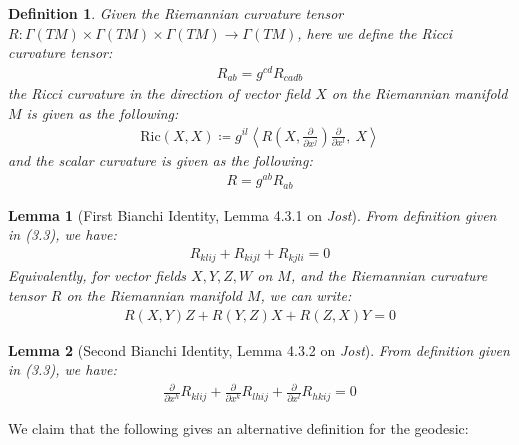 \documentclass[11pt]{book}
\theoremstyle{break}
\theoremstyle{break}
\newtheorem{lem}{Lemma}[thm]
\newtheorem{defn}{Definition}[corL]
\newcommand{\pd}{\partial}
\begin{document}
\begin{defn}
Given the Riemannian curvature tensor $R:\Gamma(TM) \times \Gamma(TM) \times \Gamma(TM) \to \Gamma(TM)$, here we define the Ricci curvature tensor:
\begin{align*}
R_{ab} = g^{cd}R_{cadb}
\end{align*}
the Ricci curvature in the direction of vector field $X$ on the Riemannian manifold $M$ is given as the following:
\begin{align*}
\text{Ric}(X,X) \coloneqq g^{il}\left\langle R\left(X, \frac{\pd}{\pd x^j}\right)\frac{\pd}{\pd x^l},\ X\right\rangle
\end{align*}
and the scalar curvature is given as the following:
\begin{align*}
R = g^{ab}R_{ab}
\end{align*}
\end{defn}

\begin{lem}[First Bianchi Identity, Lemma 4.3.1 on \textit{Jost}]
From definition given in (3.3), we have:
\begin{align*}
R_{klij} + R_{kijl} + R_{kjli} = 0
\end{align*}
Equivalently, for vector fields $X,Y,Z,W$ on $M$, and the Riemannian curvature tensor $R$ on the Riemannian manifold $M$, we can write:
\begin{align*}
R(X,Y)Z + R(Y,Z)X + R(Z,X)Y = 0
\end{align*}
\end{lem}
\begin{lem}[Second Bianchi Identity, Lemma 4.3.2 on \textit{Jost}]
From definition given in (3.3), we have:
\begin{align}
\frac{\pd}{\pd x^h}R_{klij} + \frac{\pd}{\pd x^k}R_{lhij} + \frac{\pd}{\pd x^l} R_{hkij} = 0
\end{align}
\end{lem}

\hfill\break
\hfill\break
We claim that the following gives an alternative definition for the geodesic:
\end{document}

